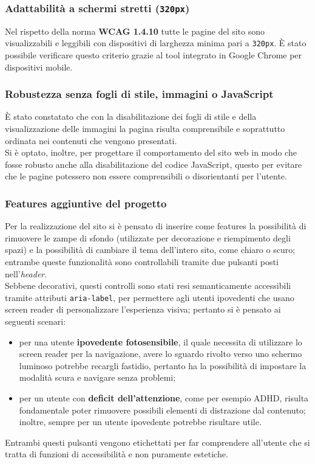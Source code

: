 \documentclass[a4paper,10pt]{article}
\begin{document}
	\subsubsection{Adattabilità a schermi stretti (\texttt{320px})}
	Nel rispetto della norma \textbf{WCAG 1.4.10} tutte le pagine del sito sono visualizzabili e leggibili con dispositivi di larghezza minima pari a \texttt{320px}. È stato possibile verificare questo criterio grazie al tool integrato in Google Chrome per dispositivi mobile.
	
	\subsubsection{Robustezza senza fogli di stile, immagini o JavaScript}
	È stato constatato che con la disabilitazione dei fogli di stile e della visualizzazione delle immagini la pagina risulta comprensibile e soprattutto ordinata nei contenuti che vengono presentati.\\
	Si è optato, inoltre, per progettare il comportamento del sito web in modo che fosse robusto anche alla disabilitazione del codice JavaScript, questo per evitare che le pagine potessero non essere comprensibili o disorientanti per l'utente.
	
	\subsubsection{Features aggiuntive del progetto}
	Per la realizzazione del sito si è pensato di inserire come features la possibilità di rimuovere le zampe di sfondo (utilizzate per decorazione e riempimento degli spazi) e la possibilità di cambiare il tema dell'intero sito, come chiaro o scuro; entrambe queste funzionalità sono controllabili tramite due pulsanti posti nell'\textit{header}.\\
	Sebbene decorativi, questi controlli sono stati resi semanticamente accessibili tramite attributi \texttt{aria-label}, per permettere agli utenti ipovedenti che usano screen reader di personalizzare l'esperienza visiva; pertanto si è pensato ai seguenti scenari:
	\begin{itemize}
		\item per una utente \textbf{ipovedente fotosensibile}, il quale necessita di utilizzare lo screen reader per la navigazione, avere lo sguardo rivolto verso uno schermo luminoso potrebbe recargli fastidio, pertanto ha la possibilità di impostare la modalità scura e navigare senza problemi;
		\item per un utente con \textbf{deficit dell'attenzione}, come per esempio ADHD, risulta fondamentale poter rimuovere possibili elementi di distrazione dal contenuto; inoltre, sempre per un utente ipovedente potrebbe risultare utile.
	\end{itemize}
	Entrambi questi pulsanti vengono etichettati per far comprendere all'utente che si tratta di funzioni di accessibilità e non puramente estetiche.
	
\end{document}
